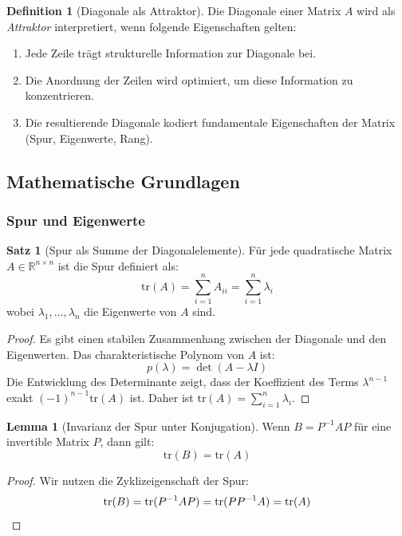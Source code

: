 \documentclass[a4paper,12pt]{article}
\theoremstyle{definition}
\newtheorem{definition}{Definition}
\newtheorem{satz}{Satz}
\newtheorem{lemma}{Lemma}
\begin{document}
\begin{definition}[Diagonale als Attraktor]
	Die Diagonale einer Matrix $A$ wird als \emph{Attraktor} interpretiert, wenn folgende Eigenschaften gelten:
	\begin{enumerate}
		\item Jede Zeile trägt strukturelle Information zur Diagonale bei.
		\item Die Anordnung der Zeilen wird optimiert, um diese Information zu konzentrieren.
		\item Die resultierende Diagonale kodiert fundamentale Eigenschaften der Matrix (Spur, Eigenwerte, Rang).
	\end{enumerate}
\end{definition}

\subsection{Mathematische Grundlagen}

\subsubsection{Spur und Eigenwerte}

\begin{satz}[Spur als Summe der Diagonalelemente]
	\label{satz:spur}
	Für jede quadratische Matrix $A \in \mathbb{R}^{n \times n}$ ist die Spur definiert als:
	\[
	\text{tr}(A) = \sum_{i=1}^n A_{ii} = \sum_{i=1}^n \lambda_i
	\]
	wobei $\lambda_1, \ldots, \lambda_n$ die Eigenwerte von $A$ sind.
\end{satz}

\begin{proof}
	Es gibt einen stabilen Zusammenhang zwischen der Diagonale und den Eigenwerten. Das charakteristische Polynom von $A$ ist:
	\[
	p(\lambda) = \det(A - \lambda I)
	\]
	Die Entwicklung des Determinante zeigt, dass der Koeffizient des Terms $\lambda^{n-1}$ exakt $(-1)^{n-1} \text{tr}(A)$ ist. Daher ist $\text{tr}(A) = \sum_{i=1}^n \lambda_i$.
\end{proof}

\begin{lemma}[Invarianz der Spur unter Konjugation]
	\label{lem:spur-invarianz}
	Wenn $B = P^{-1} A P$ für eine invertible Matrix $P$, dann gilt:
	\[
	\text{tr}(B) = \text{tr}(A)
	\]
\end{lemma}

\begin{proof}
	Wir nutzen die Zyklizeigenschaft der Spur:
	\[
	\text{tr}(B) = \text{tr}(P^{-1} A P) = \text{tr}(P P^{-1} A) = \text{tr}(A) \qedhere
	\]
\end{proof}
\end{document}
